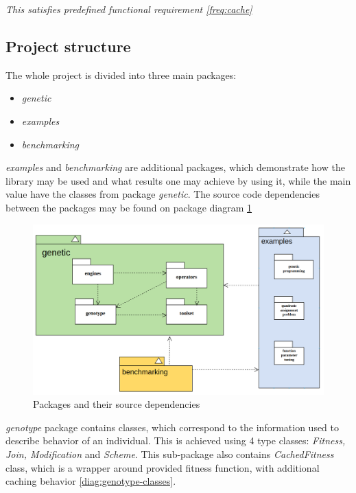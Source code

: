 \begin{itemize}
\smallskip\textit{This satisfies predefined functional requirement \ref{freq:cache}}
 
\medbreak


\end{itemize}

\subsection{Project structure}

The whole project is divided into three main packages:
\begin{itemize}
\item \textit{genetic}
\item \textit{examples}
\item \textit{benchmarking}
\end{itemize}

\textit{examples} and \textit{benchmarking} are additional packages, which demonstrate how the library may be used and what results one may achieve by using it, while the main value have the classes from package \textit{genetic}. The source code dependencies between the packages may be found on package diagram \ref{diag:packages}

\begin{figure}[h]
\centering\includegraphics[width=1.\textwidth]{img/diagrams/alleles-top-packages}
\caption{Packages and their source dependencies}\label{diag:packages}
\end{figure}

\textit{genotype} package contains classes, which correspond to the information used to describe behavior of an individual. This is achieved using 4 type classes: \textit{Fitness, Join, Modification} and \textit{Scheme}. This sub-package also contains \textit{CachedFitness} class, which is a wrapper around provided fitness function, with additional caching behavior \ref{diag:genotype-classes}. 


